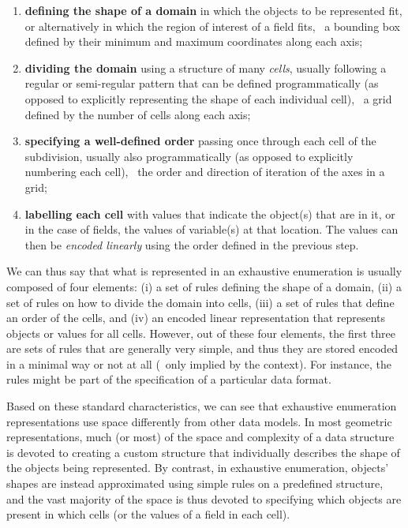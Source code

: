 \begin{enumerate}

\item \textbf{defining the shape of a domain} in which the objects to be represented fit, or alternatively in which the region of interest of a field fits, \eg\ a bounding box defined by their minimum and maximum coordinates along each axis;

\item \textbf{dividing the domain} using a structure of many \emph{cells}, usually following a regular or semi-regular pattern that can be defined programmatically (as opposed to explicitly representing the shape of each individual cell), \eg\ a grid defined by the number of cells along each axis;

\item \textbf{specifying a well-defined order} passing once through each cell of the subdivision, usually also programmatically (as opposed to explicitly numbering each cell), \eg\ the order and direction of iteration of the axes in a grid;

\item \textbf{labelling each cell} with values that indicate the object(s) that are in it, or in the case of fields, the values of variable(s) at that location.
The values can then be \emph{encoded linearly} using the order defined in the previous step.

\end{enumerate}

We can thus say that what is represented in an exhaustive enumeration is usually composed of four elements: (i) a set of rules defining the shape of a domain, (ii) a set of rules on how to divide the domain into cells, (iii) a set of rules that define an order of the cells, and (iv) an encoded linear representation that represents objects or values for all cells.
However, out of these four elements, the first three are sets of rules that are generally very simple, and thus they are stored encoded in a minimal way or not at all (\ie\ only implied by the context).
For instance, the rules might be part of the specification of a particular data format.

Based on these standard characteristics, we can see that exhaustive enumeration representations use space differently from other data models.
In most geometric representations, much (or most) of the space and complexity of a data structure is devoted to creating a custom structure that individually describes the shape of the objects being represented.
By contrast, in exhaustive enumeration, objects' shapes are instead approximated using simple rules on a predefined structure, and the vast majority of the space is thus devoted to specifying which objects are present in which cells (or the values of a field in each cell).

